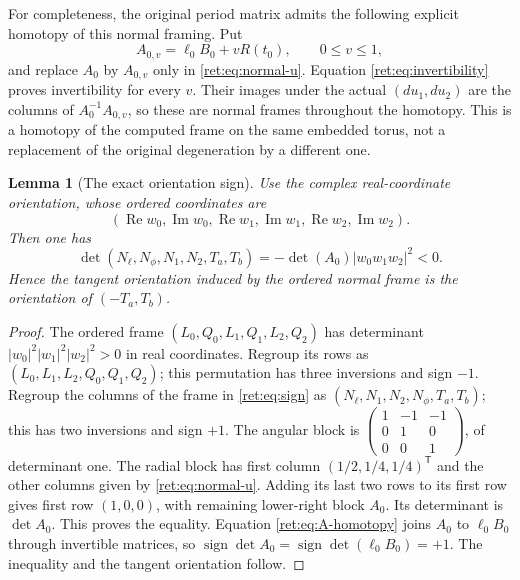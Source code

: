 \documentclass[11pt,letterpaper]{article}
\numberwithin{equation}{section}
\newtheorem{lemma}[theorem]{Lemma}
\theoremstyle{definition}
\theoremstyle{remark}
\begin{document}
For completeness, the original period matrix admits the following
explicit homotopy of this normal framing.  Put
\begin{equation}
 A_{0,v}=\ell_0B_0+vR(t_0),\qquad 0\leq v\leq1,
 \label{ret:eq:A-homotopy}
\end{equation}
and replace \(A_0\) by \(A_{0,v}\) only in
\eqref{ret:eq:normal-u}.  Equation \eqref{ret:eq:invertibility} proves
invertibility for every \(v\).  Their images under the actual
\((du_1,du_2)\) are the columns of \(A_0^{-1}A_{0,v}\), so these
are normal frames throughout the homotopy.  This is a homotopy of
the computed frame on the same embedded torus, not a replacement of
the original degeneration by a different one.

\begin{lemma}[The exact orientation sign]
Use the complex real-coordinate orientation, whose ordered coordinates are
\[
 (\operatorname{Re}w_0,\operatorname{Im}w_0,
  \operatorname{Re}w_1,\operatorname{Im}w_1,
  \operatorname{Re}w_2,\operatorname{Im}w_2).
\]
Then one has
\begin{equation}
 \det(N_\ell,N_\phi,N_1,N_2,T_a,T_b)
       =-\det(A_0)|w_0w_1w_2|^2<0.
 \label{ret:eq:sign}
\end{equation}
Hence the tangent orientation induced by the ordered normal frame is
the orientation of \((-T_a,T_b)\).
\end{lemma}
\begin{proof}
The ordered frame \((L_0,Q_0,L_1,Q_1,L_2,Q_2)\) has determinant
\(|w_0|^2|w_1|^2|w_2|^2>0\) in real coordinates.  Regroup its rows
as \((L_0,L_1,L_2,Q_0,Q_1,Q_2)\); this permutation has three
inversions and sign \(-1\).  Regroup the columns of the frame in
\eqref{ret:eq:sign} as
\((N_\ell,N_1,N_2,N_\phi,T_a,T_b)\); this has two inversions and
sign \(+1\).  The angular block is
\(\left(\begin{smallmatrix}1&-1&-1\\0&1&0\\0&0&1\end{smallmatrix}\right)\),
of determinant one.  The radial block has first column
\((1/2,1/4,1/4)^{\mathsf T}\) and the other columns given by
\eqref{ret:eq:normal-u}.  Adding its last two rows to its first row gives
first row \((1,0,0)\), with remaining lower-right block \(A_0\).
Its determinant is \(\det A_0\).  This proves the equality.
Equation \eqref{ret:eq:A-homotopy} joins \(A_0\) to \(\ell_0B_0\)
through invertible matrices, so
\(\operatorname{sign}\det A_0=\operatorname{sign}\det(\ell_0B_0)=+1\).
The inequality and the tangent orientation follow.
\end{proof}
\end{document}
